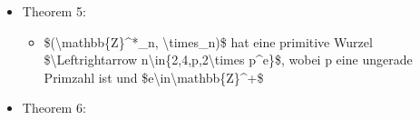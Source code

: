\documentclass[a4paper]{article}
\begin{document}
\begin{multicols}{3}
\begin{itemize}
              \begin{itemize}
                  \item
                        Sei \$(S,\textbackslash circ)\$ eine Gruppe, \$g\textbackslash in
                        S\$ und \$g\^{}a:=g\textbackslash circ
                        g\textbackslash circ...\textbackslash circ g\$ (a mal mit
                        \$a\textbackslash in\textbackslash mathbb\{Z\}\^{}+\$)
                  \item
                        Dann heißt g eine primitive Wurzel oder ein Generator von
                        \$(S,\textbackslash circ):\textbackslash Leftrightarrow\{g\^{}a\textbackslash leq
                        a\textbackslash leq \textbar S\textbar\}=S\$
                  \item
                        Beispiele:

                        \begin{itemize}
                            \item
                                  1 ist eine primitive Wurzel von \$(\textbackslash mathbb\{Z\}\_n,
                                  +\_n)\$
                            \item
                                  3 ist eine Primitivwurzel von
                                  \$(\textbackslash mathbb\{Z\}\^{}*\_7, \textbackslash times\_7)\$
                        \end{itemize}
                  \item
                        Nicht alle Gruppen haben Primitivwurzeln, und diejenigen, die sie
                        haben, nennt man zyklische Gruppen
              \end{itemize}
        \item
              Theorem 5:

              \begin{itemize}
                  \item
                        \$(\textbackslash mathbb\{Z\}\^{}*\_n, \textbackslash times\_n)\$
                        hat eine primitive Wurzel \$\textbackslash Leftrightarrow
                        n\textbackslash in\{2,4,p,2\textbackslash times p\^{}e\}\$, wobei p
                        eine ungerade Primzahl ist und
                        \$e\textbackslash in\textbackslash mathbb\{Z\}\^{}+\$
              \end{itemize}
        \item
              Theorem 6:


\end{itemize}
\end{multicols}
\end{document}
